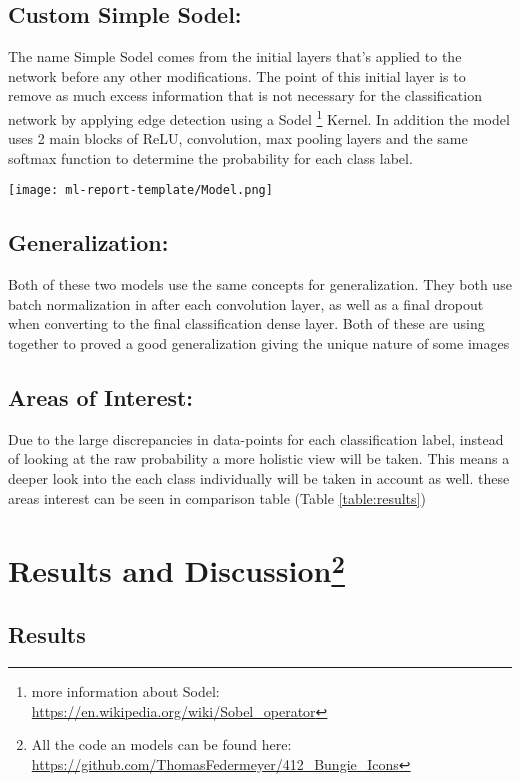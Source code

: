 \documentclass[11pt,a4paper]{article}
\begin{document}
\subsection*{Custom Simple Sodel:}
The name Simple Sodel comes from the initial layers that's applied to the network before any other modifications. The point of this initial layer is to remove as much excess information that is not necessary for the classification network by applying edge detection using a Sodel \footnote{more information about Sodel: \url{https://en.wikipedia.org/wiki/Sobel_operator}} Kernel. In addition the model uses 2 main blocks of ReLU, convolution, max pooling layers and the same softmax function to determine the probability for each class label.  
\begin{center}
    \texttt{[image: ml-report-template/Model.png]}
\end{center}

\subsection*{Generalization:}
Both of these two models use the same concepts for generalization. They both use batch normalization in after each convolution layer, as well as a final dropout when converting to the final classification dense layer. Both of these are using together to proved a good generalization giving the unique nature of some images

\subsection*{Areas of Interest:}
Due to the large discrepancies in data-points for each classification label, instead of looking at the raw probability a more holistic view will be taken. This means a deeper look into the each class individually will be taken in account as well. these areas interest can be seen in comparison table (Table \ref{table:results})


\section{Results and Discussion\footnote{All the code an models can be found here: \url{https://github.com/ThomasFedermeyer/412_Bungie_Icons}
}} 

\subsection*{Results}
\end{document}
